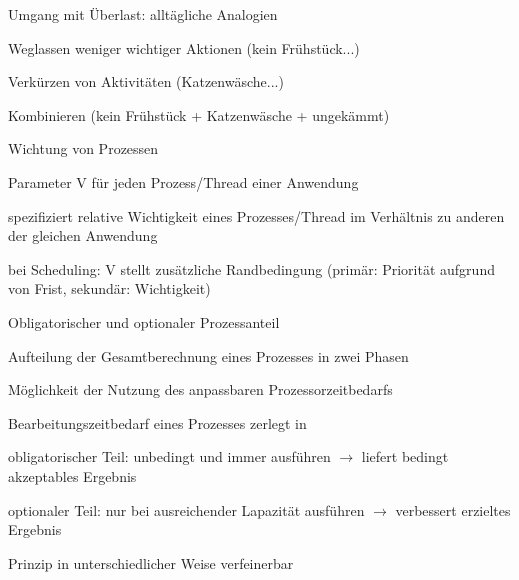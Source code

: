 \documentclass[a4paper]{article}
\begin{document}
\begin{multicols}{3}
    Umgang mit Überlast: alltägliche Analogien
    \begin{enumerate*}
        \item Weglassen weniger wichtiger Aktionen (kein Frühstück...)
        \item Verkürzen von Aktivitäten (Katzenwäsche...)
        \item Kombinieren (kein Frühstück + Katzenwäsche + ungekämmt)
    \end{enumerate*}

    Wichtung von Prozessen
    \begin{itemize*}
        \item Parameter V für jeden Prozess/Thread einer Anwendung
        \item spezifiziert relative Wichtigkeit eines Prozesses/Thread im Verhältnis zu anderen der gleichen Anwendung
        \item bei Scheduling: V stellt zusätzliche Randbedingung (primär: Priorität aufgrund von Frist, sekundär: Wichtigkeit)
    \end{itemize*}

    Obligatorischer und optionaler Prozessanteil
    \begin{itemize*}
        \item Aufteilung der Gesamtberechnung eines Prozesses in zwei Phasen
        \item Möglichkeit der Nutzung des anpassbaren Prozessorzeitbedarfs
        \item Bearbeitungszeitbedarf eines Prozesses zerlegt in
        \begin{enumerate*}
            \item obligatorischer Teil: unbedingt und immer ausführen $\rightarrow$ liefert bedingt akzeptables Ergebnis
            \item optionaler Teil: nur bei ausreichender Lapazität ausführen $\rightarrow$ verbessert erzieltes Ergebnis
        \end{enumerate*}
        \item Prinzip in unterschiedlicher Weise verfeinerbar
    \end{itemize*}


\end{multicols}
\end{document}
